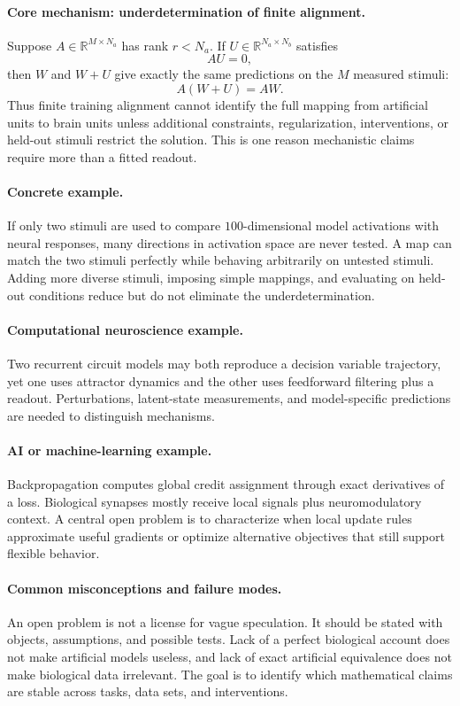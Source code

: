 \paragraph{Core mechanism: underdetermination of finite alignment.}
Suppose \(A\in\mathbb R^{M\times N_a}\) has rank \(r<N_a\). If \(U\in\mathbb R^{N_a\times N_b}\) satisfies
\[
AU=0,
\]
then \(W\) and \(W+U\) give exactly the same predictions on the \(M\) measured stimuli:
\[
A(W+U)=AW.
\]
Thus finite training alignment cannot identify the full mapping from artificial units to brain units unless additional constraints, regularization, interventions, or held-out stimuli restrict the solution. This is one reason mechanistic claims require more than a fitted readout.

\paragraph{Concrete example.}
If only two stimuli are used to compare \(100\)-dimensional model activations with neural responses, many directions in activation space are never tested. A map can match the two stimuli perfectly while behaving arbitrarily on untested stimuli. Adding more diverse stimuli, imposing simple mappings, and evaluating on held-out conditions reduce but do not eliminate the underdetermination.

\paragraph{Computational neuroscience example.}
Two recurrent circuit models may both reproduce a decision variable trajectory, yet one uses attractor dynamics and the other uses feedforward filtering plus a readout. Perturbations, latent-state measurements, and model-specific predictions are needed to distinguish mechanisms.

\paragraph{AI or machine-learning example.}
Backpropagation computes global credit assignment through exact derivatives of a loss. Biological synapses mostly receive local signals plus neuromodulatory context. A central open problem is to characterize when local update rules approximate useful gradients or optimize alternative objectives that still support flexible behavior.

\paragraph{Common misconceptions and failure modes.}
An open problem is not a license for vague speculation. It should be stated with objects, assumptions, and possible tests. Lack of a perfect biological account does not make artificial models useless, and lack of exact artificial equivalence does not make biological data irrelevant. The goal is to identify which mathematical claims are stable across tasks, data sets, and interventions.

